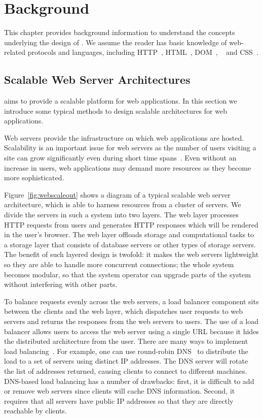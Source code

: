 \chapter{Background}

This chapter provides background information to understand the concepts
underlying the design of \cbtwo. We assume the reader has basic knowledge of
web-related protocols and languages, including HTTP~\cite{rfc7231},
HTML~\cite{hickson2012html},  DOM~\cite{2000Document},
\js~\cite{ecmascript2011ecmascript} and CSS~\cite{css21}.

\webscaleoutfig{}

\section{Scalable Web Server Architectures}
\label{sec:websys}

\cbtwo aims to provide a scalable platform for web applications.
In this section we introduce some typical methods to design
scalable architectures for web applications.

Web servers provide the infrastructure on which web applications 
are hosted.
Scalability is an important issue for web servers as the number of users
visiting a site can grow significantly even during short time spans~\cite{berners1998world}.
Even without an increase in users,
web applications may demand more resources as they become more sophisticated.

Figure~\ref{fig:webscaleout} shows a diagram of a typical scalable web server
architecture, which is able to harness resources from a cluster of servers. We
divide the servers in such a system into two layers. The web layer
processes HTTP requests from users and generates HTTP responses which will be
rendered in the user's browser. The web layer offloads storage and
computational tasks to a storage layer that consists of database servers or
other types of storage servers. The benefit of such layered design is twofold:
it makes the web servers lightweight so they are able to handle more
concurrent connections; the whole system becomes modular, so that the system
operator can upgrade parts of the system without interfering with other parts.

To balance requests evenly across the web servers, a load balancer component
sits between the clients and the web layer, which dispatches user requests to
web servers and returns the responses from the web servers to users. The use
of a load balancer allows users to access the web server using a single URL
because it hides the distributed architecture from the user. There are many
ways to implement load balancing~\cite{cardellini2002state}. For example, one can 
use round-robin DNS~\cite{} to distribute the load to a set of servers using 
distinct IP addresses.  The DNS server will rotate the list of addresses
returned, causing clients to connect to different machines.
%
DNS-based load balancing has a number of drawbacks:  
first, it is difficult to add or remove web servers since clients will
cache DNS information.  Second, it requires that all servers have public 
IP addresses so that they are directly reachable by clients.  

